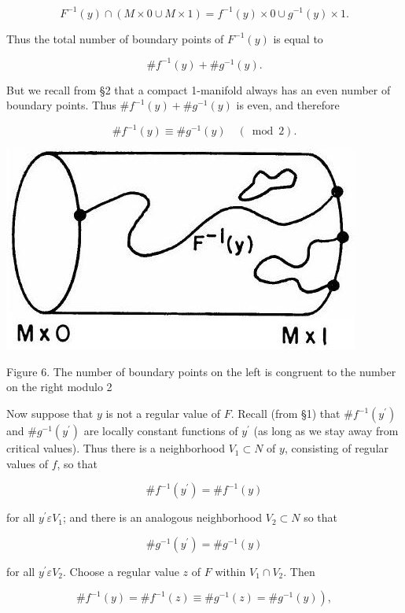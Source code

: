\documentclass[10pt, letterpaper]{article}
\begin{document}
$$
F^{-1}(y) \cap(M \times 0 \cup M \times 1)=f^{-1}(y) \times 0 \cup g^{-1}(y) \times 1 .
$$

Thus the total number of boundary points of $F^{-1}(y)$ is equal to

$$
\# f^{-1}(y)+\# g^{-1}(y) .
$$

But we recall from §2 that a compact 1-manifold always has an even number of boundary points. Thus $\# f^{-1}(y)+\# g^{-1}(y)$ is even, and therefore

$$
\# f^{-1}(y) \equiv \# g^{-1}(y) \quad(\bmod 2) .
$$

\begin{center}
\includegraphics[scale=0.2]{2025_05_28_7c9927389b272ddbc2c3g-33}
\end{center}

Figure 6. The number of boundary points on the left is congruent to the number on the right modulo 2

Now suppose that $y$ is not a regular value of $F$. Recall (from §1) that $\# f^{-1}\left(y^{\prime}\right)$ and $\# g^{-1}\left(y^{\prime}\right)$ are locally constant functions of $y^{\prime}$ (as long as we stay away from critical values). Thus there is a neighborhood $V_{1} \subset N$ of $y$, consisting of regular values of $f$, so that

$$
\# f^{-1}\left(y^{\prime}\right)=\# f^{-1}(y)
$$

for all $y^{\prime} \varepsilon V_{1}$; and there is an analogous neighborhood $V_{2} \subset N$ so that

$$
\# g^{-1}\left(y^{\prime}\right)=\# g^{-1}(y)
$$

for all $y^{\prime} \varepsilon V_{2}$. Choose a regular value $z$ of $F$ within $V_{1} \cap V_{2}$. Then

$$
\left.\# f^{-1}(y)=\# f^{-1}(z) \equiv \# g^{-1}(z)=\# g^{-1}(y)\right),
$$
\end{document}
